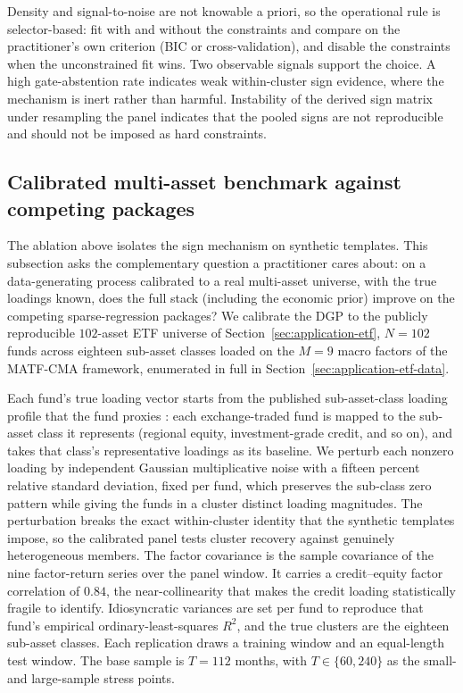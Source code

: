 \documentclass[article]{jss}
\begin{document}
Density and signal-to-noise are
not knowable a priori, so the operational rule is selector-based: fit
with and without the constraints and compare on the practitioner's own
criterion (BIC or cross-validation), and disable the constraints when
the unconstrained fit wins. Two observable signals support the choice.
A high gate-abstention rate indicates weak within-cluster sign evidence,
where the mechanism is inert rather than harmful. Instability of the
derived sign matrix under resampling the panel indicates that the pooled
signs are not reproducible and should not be imposed as hard
constraints.


\subsection[Calibrated multi-asset benchmark]{Calibrated multi-asset
benchmark against competing packages} \label{sec:sim-calibrated}

The ablation above isolates the sign mechanism on synthetic templates.
This subsection asks the complementary question a practitioner cares
about: on a data-generating process calibrated to a real multi-asset
universe, with the true loadings known, does the full 
stack (including the economic prior) improve on the competing
sparse-regression packages? We calibrate the DGP to the publicly reproducible $102$-asset ETF
universe of Section~\ref{sec:application-etf}, $N = 102$ funds across
eighteen sub-asset classes loaded on the $M = 9$ macro factors of the
MATF-CMA framework, enumerated in full in
Section~\ref{sec:application-etf-data}.

Each fund's true loading vector starts from the published
sub-asset-class loading profile that the fund proxies
\citep{Sepp+Hansen+Kastenholz:2026MATF}: each exchange-traded fund is
mapped to the sub-asset class it represents (regional equity,
investment-grade credit, and so on), and takes that class's
representative loadings as its baseline. We perturb each nonzero loading
by independent Gaussian multiplicative noise with a fifteen percent
relative standard deviation, fixed per fund, which preserves the
sub-class zero pattern while giving the funds in a cluster distinct
loading magnitudes. The perturbation breaks the exact within-cluster
identity that the synthetic templates impose, so the calibrated panel
tests cluster recovery against genuinely heterogeneous members. The factor covariance is the sample covariance of
the nine factor-return series over the panel window. It carries a
credit--equity factor correlation of $0.84$, the near-collinearity that
makes the credit loading statistically fragile to identify. Idiosyncratic
variances are set per fund to reproduce that fund's empirical
ordinary-least-squares $R^2$, and the true clusters are the eighteen
sub-asset classes. Each replication draws a training window and an
equal-length test window. The base sample is $T = 112$ months, with
$T \in \{60, 240\}$ as the small- and large-sample stress points.
\end{document}
